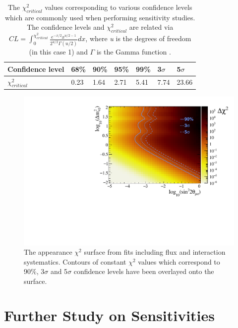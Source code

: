 \begin{table}[h!]
\begin{tabular}{lllllll}
 Confidence level & 68\% & 90\% & 95\% & 99\% & 3$\sigma$ & 5$\sigma$ \\ \hline
$\chi^2_{critical}$ & 0.23 & 1.64 & 2.71 & 5.41 & 7.74 & 23.66
\end{tabular}
\caption[$\chi^2_{critical}$ values for various confidence levels.]{The $\chi^2_{critical}$ values corresponding to various confidence levels which are commonly used when performing sensitivity studies. The confidence levels and $\chi^2_{critical}$ are related via $CL = \int_0^{\chi^2_{critical}} \frac{e^{-x/2}x^{u/2-1}}{2^{u/2}\Gamma(u/2)} dx$, where \textit{u} is the degrees of freedom (in this case 1) and $\Gamma$ is the Gamma function \cite{critical_chi2_book}.}
\label{table:critical_chi2_values}
\end{table}

\begin{figure}[h!]
    \centering
    \includegraphics[width = \largefigwidth]{figures-chap6/exclusion_contours/nue_app_03d1_chi2_surface.pdf}
    \caption[\nue appearance contours overlayed on the $\chi^2$ surface.]{The \nue appearance $\chi^2$ surface from fits including flux and interaction systematics. Contours of constant $\chi^2$ values which correspond to 90\%, 3$\sigma$ and 5$\sigma$ confidence levels have been overlayed onto the surface.}
    \label{fig:nue_app_chisq_surface}
\end{figure}

\clearpage
\section{Further Study on Sensitivities}

